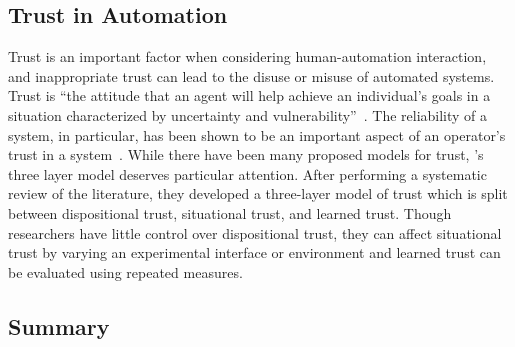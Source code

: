 \subsection{Trust in Automation}
Trust is an important factor when considering human-automation interaction, and inappropriate trust can lead to the disuse or misuse of automated systems.
Trust is ``the attitude that an agent will help achieve an individual's goals in a situation characterized by uncertainty and vulnerability''~\citep{lee_trust_2004}.
The reliability of a system, in particular, has been shown to be an important aspect of an operator's trust in a system~\citep{RN38}.
While there have been many proposed models for trust, \citeauthor{RN39}'s three layer model deserves particular attention.
After performing a systematic review of the literature, they developed a three-layer model of trust which is split between dispositional trust, situational trust, and learned trust.
Though researchers have little control over dispositional trust, they can affect situational trust by varying an experimental interface or environment and learned trust can be evaluated using repeated measures.

\subsection{Summary}

